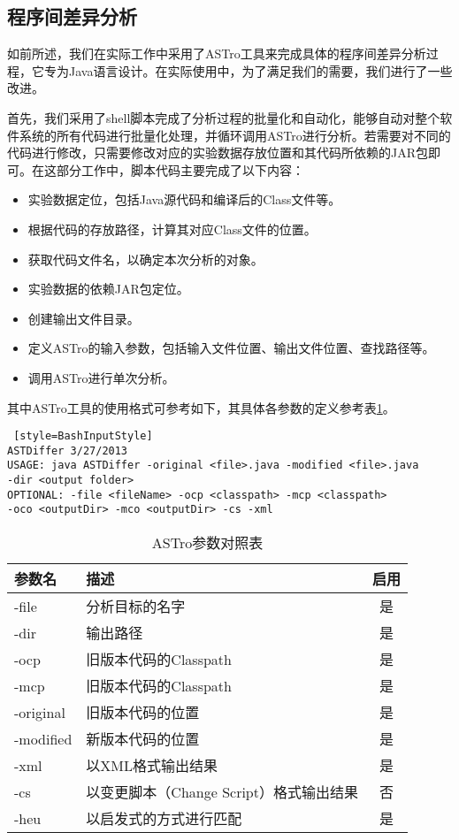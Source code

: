 \subsection{程序间差异分析}

如前所述，我们在实际工作中采用了ASTro工具来完成具体的程序间差异分析过程，它专为Java语言设计。在实际使用中，为了满足我们的需要，我们进行了一些改进。

首先，我们采用了shell脚本完成了分析过程的批量化和自动化，能够自动对整个软件系统的所有代码进行批量化处理，并循环调用ASTro进行分析。若需要对不同的代码进行修改，只需要修改对应的实验数据存放位置和其代码所依赖的JAR包即可。在这部分工作中，脚本代码主要完成了以下内容：

\begin{itemize}
	\item 实验数据定位，包括Java源代码和编译后的Class文件等。
	\item 根据代码的存放路径，计算其对应Class文件的位置。
	\item 获取代码文件名，以确定本次分析的对象。
	\item 实验数据的依赖JAR包定位。
	\item 创建输出文件目录。
	\item 定义ASTro的输入参数，包括输入文件位置、输出文件位置、查找路径等。
	\item 调用ASTro进行单次分析。
\end{itemize}

其中ASTro工具的使用格式可参考如下，其具体各参数的定义参考表\ref {ASTro}。

\begin{lstlisting} [style=BashInputStyle]
ASTDiffer 3/27/2013
USAGE: java ASTDiffer -original <file>.java -modified <file>.java 
-dir <output folder>
OPTIONAL: -file <fileName> -ocp <classpath> -mcp <classpath> 
-oco <outputDir> -mco <outputDir> -cs -xml
\end{lstlisting}	

\begin{table}
	\caption{ASTro参数对照表}
	\label{ASTro}
	\centering
	\begin{tabular}{llc}
		\toprule[1.5pt] 
		{\heiti 参数名} & {\heiti 描述} & {\heiti 启用}\\\midrule[1pt]
		-file & 分析目标的名字 & 是 \\
		-dir & 输出路径 & 是 \\
		-ocp & 旧版本代码的Classpath & 是\\
		-mcp & 旧版本代码的Classpath & 是\\
		-original    & 旧版本代码的位置 & 是\\
		-modified   & 新版本代码的位置 & 是\\
		-xml   & 以XML格式输出结果 & 是\\
		-cs   & 以变更脚本（Change Script）格式输出结果 & 否\\
		-heu   & 以启发式的方式进行匹配 & 是\\
		\bottomrule[1.5pt]
	\end{tabular}	
\end{table}

